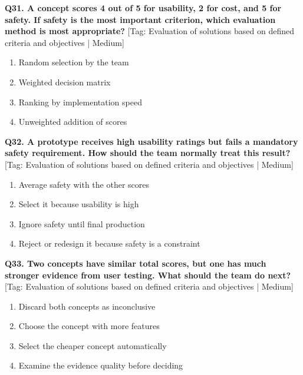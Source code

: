 \noindent\textbf{Q31. A concept scores 4 out of 5 for usability, 2 for cost, and 5 for safety. If safety is the most important criterion, which evaluation method is most appropriate?} \hfill [Tag: Evaluation of solutions based on defined criteria and objectives | Medium]
\begin{enumerate}[label=(\alph*),topsep=2pt,itemsep=1pt,partopsep=0pt,parsep=0pt]
    \item {Random selection by the team}
    \item {Weighted decision matrix}
    \item {Ranking by implementation speed}
    \item {Unweighted addition of scores}
\end{enumerate}
\vspace{2mm}

\noindent\textbf{Q32. A prototype receives high usability ratings but fails a mandatory safety requirement. How should the team normally treat this result?} \hfill [Tag: Evaluation of solutions based on defined criteria and objectives | Medium]
\begin{enumerate}[label=(\alph*),topsep=2pt,itemsep=1pt,partopsep=0pt,parsep=0pt]
    \item {Average safety with the other scores}
    \item {Select it because usability is high}
    \item {Ignore safety until final production}
    \item {Reject or redesign it because safety is a constraint}
\end{enumerate}
\vspace{2mm}

\noindent\textbf{Q33. Two concepts have similar total scores, but one has much stronger evidence from user testing. What should the team do next?} \hfill [Tag: Evaluation of solutions based on defined criteria and objectives | Medium]
\begin{enumerate}[label=(\alph*),topsep=2pt,itemsep=1pt,partopsep=0pt,parsep=0pt]
    \item {Discard both concepts as inconclusive}
    \item {Choose the concept with more features}
    \item {Select the cheaper concept automatically}
    \item {Examine the evidence quality before deciding}
\end{enumerate}
\vspace{2mm}

